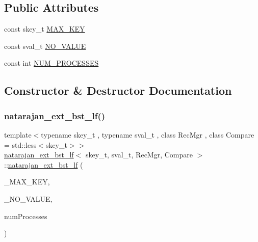 \subsection*{Public Attributes}
\begin{DoxyCompactItemize}
\item 
const skey\+\_\+t \hyperlink{classnatarajan__ext__bst__lf_a2dee51cae740c51cb83784c0196a2510}{M\+A\+X\+\_\+\+K\+EY}
\item 
const sval\+\_\+t \hyperlink{classnatarajan__ext__bst__lf_aadeab9668b86f555d34d6c64163f4472}{N\+O\+\_\+\+V\+A\+L\+UE}
\item 
const int \hyperlink{classnatarajan__ext__bst__lf_aeea14767b18273f70c60eb5f476c4ee5}{N\+U\+M\+\_\+\+P\+R\+O\+C\+E\+S\+S\+ES}
\end{DoxyCompactItemize}


\subsection{Constructor \& Destructor Documentation}
\mbox{\label{classnatarajan__ext__bst__lf_a3004e0b831b62ffbe50fce8c0bccdd53}} 
\subsubsection{\texorpdfstring{natarajan\+\_\+ext\+\_\+bst\+\_\+lf()}{natarajan\_ext\_bst\_lf()}\hspace{0.1cm}{\footnotesize\ttfamily [1/2]}}
{\footnotesize\ttfamily template$<$typename skey\+\_\+t , typename sval\+\_\+t , class Rec\+Mgr , class Compare  = std\+::less$<$skey\+\_\+t$>$$>$ \\
\hyperlink{classnatarajan__ext__bst__lf}{natarajan\+\_\+ext\+\_\+bst\+\_\+lf}$<$ skey\+\_\+t, sval\+\_\+t, Rec\+Mgr, Compare $>$\+::\hyperlink{classnatarajan__ext__bst__lf}{natarajan\+\_\+ext\+\_\+bst\+\_\+lf} (\begin{DoxyParamCaption}\item[{const skey\+\_\+t \&}]{\+\_\+\+M\+A\+X\+\_\+\+K\+EY,  }\item[{const sval\+\_\+t \&}]{\+\_\+\+N\+O\+\_\+\+V\+A\+L\+UE,  }\item[{const int}]{num\+Processes }\end{DoxyParamCaption})\hspace{0.3cm}{\ttfamily [inline]}}

